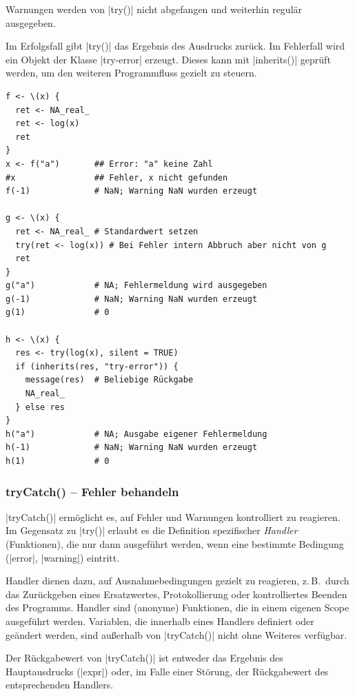 \documentclass[10pt,twocolumn]{scrartcl}
\renewcommand{\lstinline}{\mycoloredinline}
\begin{document}
Warnungen werden von \lstinline|try()| nicht abgefangen und weiterhin regulär ausgegeben.

Im Erfolgsfall gibt \lstinline|try()| das Ergebnis des Ausdrucks zurück. Im Fehlerfall wird ein Objekt der Klasse \lstinline|try-error| erzeugt. Dieses kann mit \lstinline|inherits()| geprüft werden, um den weiteren Programmfluss gezielt zu steuern.

\begin{lstlisting}
f <- \(x) {
  ret <- NA_real_
  ret <- log(x)
  ret
}
x <- f("a")       ## Error: "a" keine Zahl
#x                ## Fehler, x nicht gefunden
f(-1)             # NaN; Warning NaN wurden erzeugt

g <- \(x) {
  ret <- NA_real_ # Standardwert setzen
  try(ret <- log(x)) # Bei Fehler intern Abbruch aber nicht von g
  ret
}
g("a")            # NA; Fehlermeldung wird ausgegeben
g(-1)             # NaN; Warning NaN wurden erzeugt
g(1)              # 0

h <- \(x) {
  res <- try(log(x), silent = TRUE)
  if (inherits(res, "try-error")) {
    message(res)  # Beliebige Rückgabe
    NA_real_
  } else res
}
h("a")            # NA; Ausgabe eigener Fehlermeldung
h(-1)             # NaN; Warning NaN wurden erzeugt
h(1)              # 0
\end{lstlisting}


\subsubsection{tryCatch() -- Fehler behandeln}

\lstinline|tryCatch()| ermöglicht es, auf Fehler und Warnungen kontrolliert zu reagieren. Im Gegensatz zu \lstinline|try()| erlaubt es die Definition spezifischer \emph{Handler} (Funktionen), die nur dann ausgeführt werden, wenn eine bestimmte Bedingung (\lstinline|error|, \lstinline|warning|) eintritt. 

Handler dienen dazu, auf Ausnahmebedingungen gezielt zu reagieren, z.\,B.\ durch das Zurückgeben eines Ersatzwertes, Protokollierung oder kontrolliertes Beenden des Programms. Handler sind (anonyme) Funktionen, die in einem eigenen Scope ausgeführt werden. Variablen, die innerhalb eines Handlers definiert oder geändert werden, sind außerhalb von \lstinline|tryCatch()| nicht ohne Weiteres verfügbar.

Der Rückgabewert von \lstinline|tryCatch()| ist entweder das Ergebnis des Hauptausdrucks (\lstinline|expr|) oder, im Falle einer Störung, der Rückgabewert des entsprechenden Handlers. 
\end{document}
